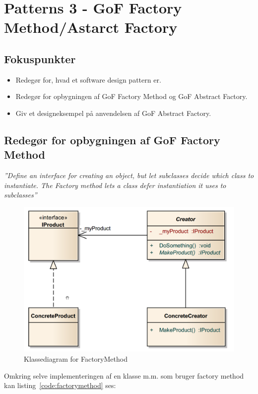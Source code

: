 \section{Patterns 3 - GoF Factory Method/Astarct Factory}

\subsection{Fokuspunkter}

\begin{itemize}
	\item Redegør for, hvad et software design pattern er.
	\item Redegør for opbygningen af GoF Factory Method og GoF Abstract Factory.
	\item Giv et designeksempel på anvendelsen af GoF Abstract Factory.
\end{itemize}



\subsection{Redegør for opbygningen af GoF Factory Method}

\textit{''Define an interface for creating an object, but let subclasses decide which class to instantiate. The Factory method lets a class defer instantiation it uses to subclasses''}

\begin{figure}[H]
	\centering
	\includegraphics[width=0.6\linewidth]{figs/facmet}
	\caption{Klassediagram for FactoryMethod}
	\label{fig:facmet}
\end{figure}

Omkring selve implementeringen af en klasse m.m. som bruger factory method kan listing~\ref{code:factorymethod} ses:

